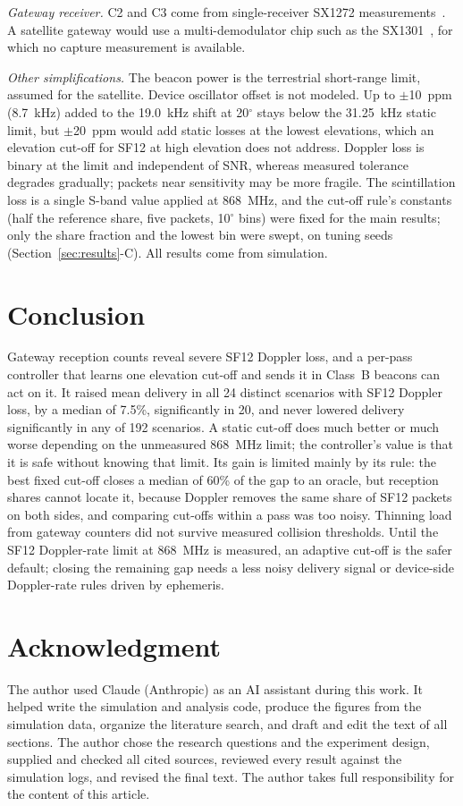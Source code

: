 \documentclass[journal]{IEEEtran}
\begin{document}
\emph{Gateway receiver.} C2 and C3 come from single-receiver SX1272 measurements~\cite{croce2018,bor2016}. A satellite gateway would use a multi-demodulator chip such as the SX1301~\cite{sx1301}, for which no capture measurement is available.

\emph{Other simplifications.} The beacon power is the terrestrial short-range limit, assumed for the satellite. Device oscillator offset is not modeled. Up to $\pm$10~ppm (8.7~kHz) added to the 19.0~kHz shift at 20$^\circ$ stays below the 31.25~kHz static limit, but $\pm$20~ppm would add static losses at the lowest elevations, which an elevation cut-off for SF12 at high elevation does not address. Doppler loss is binary at the limit and independent of SNR, whereas measured tolerance degrades gradually; packets near sensitivity may be more fragile. The scintillation loss is a single S-band value applied at 868~MHz, and the cut-off rule's constants (half the reference share, five packets, 10$^\circ$ bins) were fixed for the main results; only the share fraction and the lowest bin were swept, on tuning seeds (Section~\ref{sec:results}-C). All results come from simulation.

\section{Conclusion}
Gateway reception counts reveal severe SF12 Doppler loss, and a per-pass controller that learns one elevation cut-off and sends it in Class~B beacons can act on it. It raised mean delivery in all 24 distinct scenarios with SF12 Doppler loss, by a median of 7.5\%, significantly in 20, and never lowered delivery significantly in any of 192 scenarios. A static cut-off does much better or much worse depending on the unmeasured 868~MHz limit; the controller's value is that it is safe without knowing that limit. Its gain is limited mainly by its rule: the best fixed cut-off closes a median of 60\% of the gap to an oracle, but reception shares cannot locate it, because Doppler removes the same share of SF12 packets on both sides, and comparing cut-offs within a pass was too noisy. Thinning load from gateway counters did not survive measured collision thresholds. Until the SF12 Doppler-rate limit at 868~MHz is measured, an adaptive cut-off is the safer default; closing the remaining gap needs a less noisy delivery signal or device-side Doppler-rate rules driven by ephemeris.

\section*{Acknowledgment}
The author used Claude (Anthropic) as an AI assistant during this work. It helped write the simulation and analysis code, produce the figures from the simulation data, organize the literature search, and draft and edit the text of all sections. The author chose the research questions and the experiment design, supplied and checked all cited sources, reviewed every result against the simulation logs, and revised the final text. The author takes full responsibility for the content of this article.
\end{document}
